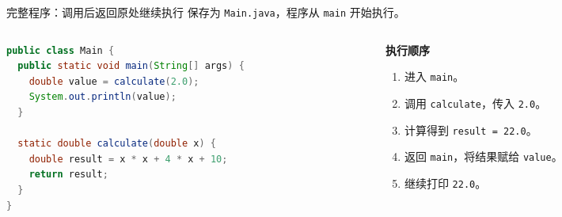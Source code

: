\documentclass[aspectratio=169]{beamer}
\begin{document}
\begin{frame}[fragile]{完整程序：调用后返回原处继续执行}
  保存为 \texttt{Main.java}，程序从 \texttt{main} 开始执行。
  \par\medskip
  \begin{columns}[T,onlytextwidth]
    \begin{column}{0.66\textwidth}
      \begin{lstlisting}[language=Java]
public class Main {
  public static void main(String[] args) {
    double value = calculate(2.0);
    System.out.println(value);
  }

  static double calculate(double x) {
    double result = x * x + 4 * x + 10;
    return result;
  }
}
      \end{lstlisting}
    \end{column}
    \begin{column}{0.30\textwidth}
      \textbf{执行顺序}
      \begin{enumerate}
        \item 进入 \texttt{main}。
        \item 调用 \texttt{calculate}，传入 \texttt{2.0}。
        \item 计算得到 \texttt{result = 22.0}。
        \item 返回 \texttt{main}，将结果赋给 \texttt{value}。
        \item 继续打印 \texttt{22.0}。
      \end{enumerate}
    \end{column}
  \end{columns}
\end{frame}
\end{document}

